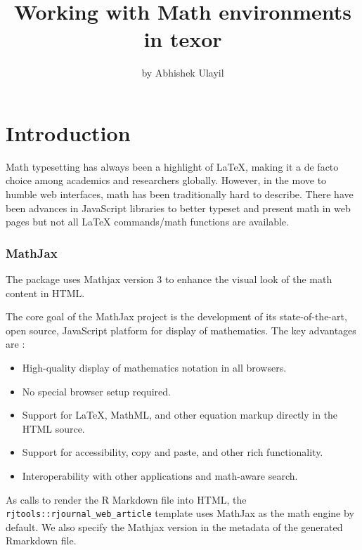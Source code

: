 \title{Working with Math environments in texor}
\author{by Abhishek Ulayil}

\maketitle


\section{Introduction}
Math typesetting has always been a highlight of LaTeX, making it a de facto choice among academics and researchers globally. However, in the move to humble web interfaces, math has been traditionally hard to describe. There have been advances in JavaScript libraries to better typeset and present math in web pages but not all LaTeX commands/math functions are available.

\subsubsection{MathJax}
The  package uses Mathjax version 3 to enhance the visual look of the math content in HTML.

The core goal of the MathJax project is the development of its state-of-the-art, open source, JavaScript platform for display of mathematics. 
The key advantages are \citep{mathjax}:
\begin{itemize}
    \item High-quality display of mathematics notation in all browsers.
    \item No special browser setup required.
    \item Support for LaTeX, MathML, and other equation markup directly in the HTML source.
    \item Support for accessibility, copy and paste, and other rich functionality.
    \item Interoperability with other applications and math-aware search.
\end{itemize}

As  calls  to render the R Markdown file into HTML,
the \verb|rjtools::rjournal_web_article| template uses MathJax as the math engine by default. 
We also specify the Mathjax version in the metadata of the generated Rmarkdown file.



